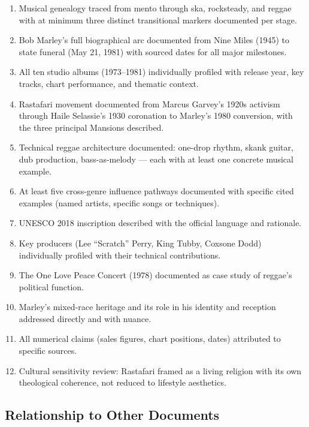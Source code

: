 \documentclass[11pt,letterpaper]{article}
\begin{document}
\begin{enumerate}
  \item Musical genealogy traced from mento through ska, rocksteady, and reggae with at minimum three distinct transitional markers documented per stage.
  \item Bob Marley's full biographical arc documented from Nine Miles (1945) to state funeral (May 21, 1981) with sourced dates for all major milestones.
  \item All ten studio albums (1973--1981) individually profiled with release year, key tracks, chart performance, and thematic context.
  \item Rastafari movement documented from Marcus Garvey's 1920s activism through Haile Selassie's 1930 coronation to Marley's 1980 conversion, with the three principal Mansions described.
  \item Technical reggae architecture documented: one-drop rhythm, skank guitar, dub production, bass-as-melody --- each with at least one concrete musical example.
  \item At least five cross-genre influence pathways documented with specific cited examples (named artists, specific songs or techniques).
  \item UNESCO 2018 inscription described with the official language and rationale.
  \item Key producers (Lee ``Scratch'' Perry, King Tubby, Coxsone Dodd) individually profiled with their technical contributions.
  \item The One Love Peace Concert (1978) documented as case study of reggae's political function.
  \item Marley's mixed-race heritage and its role in his identity and reception addressed directly and with nuance.
  \item All numerical claims (sales figures, chart positions, dates) attributed to specific sources.
  \item Cultural sensitivity review: Rastafari framed as a living religion with its own theological coherence, not reduced to lifestyle aesthetics.
\end{enumerate}

\subsection{Relationship to Other Documents}
\end{document}
